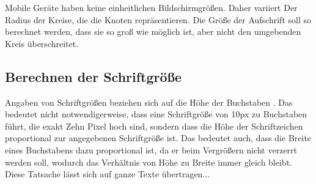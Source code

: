 Mobile Geräte haben keine einheitlichen Bildschirmgrößen. Daher variiert Der Radius der Kreise, die die Knoten repräsentieren. Die Größe der Aufschrift soll so berechnet werden, dass sie so groß wie möglich ist, aber nicht den umgebenden Kreis überschreitet.

\subsection{Berechnen der Schriftgröße}
Angaben von Schriftgrößen beziehen sich auf die Höhe der Buchstaben . Das bedeutet nicht notwendigerweise, dass eine Schriftgröße von 10px zu Buchstaben führt, die exakt Zehn Pixel hoch sind, sondern dass die Höhe der Schriftzeichen proportional zur angegebenen Schriftgröße ist. Das bedeutet auch, dass die Breite eines Buchstabens dazu proportional ist, da er beim Vergrößern nicht verzerrt werden soll, wodurch das Verhältnis von Höhe zu Breite immer gleich bleibt. Diese Tatsache lässt sich auf ganze Texte übertragen...

